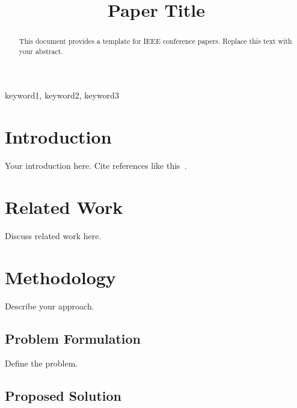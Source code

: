 \documentclass[conference]{IEEEtran}
\begin{document}
\title{Paper Title}

\author{
    \and
}

\maketitle

\begin{abstract}
    This document provides a template for IEEE conference papers.
    Replace this text with your abstract.
\end{abstract}

\begin{IEEEkeywords}
    keyword1, keyword2, keyword3
\end{IEEEkeywords}

\section{Introduction}

Your introduction here. Cite references like this~\cite{ref1}.

\section{Related Work}

Discuss related work here.

\section{Methodology}

Describe your approach.

\subsection{Problem Formulation}

Define the problem.

\subsection{Proposed Solution}
\end{document}
